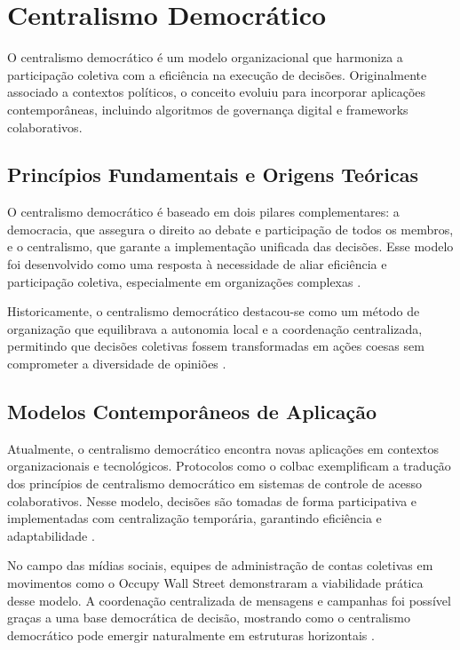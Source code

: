 \section{Centralismo Democrático}
\label{sec:centralismo_democratico}

O centralismo democrático é um modelo organizacional que harmoniza a
participação coletiva com a eficiência na execução de decisões.
Originalmente associado a contextos políticos, o conceito evoluiu para
incorporar aplicações contemporâneas, incluindo algoritmos de governança
digital e frameworks colaborativos.

\subsection{Princípios Fundamentais e Origens Teóricas}
\label{sec:principios_origens_teoricas}

O centralismo democrático é baseado em dois pilares complementares: a
democracia, que assegura o direito ao debate e participação de todos os
membros, e o centralismo, que garante a implementação unificada das
decisões. Esse modelo foi desenvolvido como uma resposta à necessidade de
aliar eficiência e participação coletiva, especialmente em organizações
complexas \cite{EstatutosDoPCP}.

Historicamente, o centralismo democrático destacou-se como um método de
organização que equilibrava a autonomia local e a coordenação centralizada,
permitindo que decisões coletivas fossem transformadas em ações coesas sem
comprometer a diversidade de opiniões \cite{CGTPStatutes}.

\subsection{Modelos Contemporâneos de Aplicação}
\label{sec:modelos_contemporaneos}

Atualmente, o centralismo democrático encontra novas aplicações em
contextos organizacionais e tecnológicos. Protocolos como o \gls{colbac}
exemplificam a tradução dos princípios de centralismo democrático em
sistemas de controle de acesso colaborativos. Nesse modelo, decisões são
tomadas de forma participativa e implementadas com centralização
temporária, garantindo eficiência e adaptabilidade \cite{Colbac}.

No campo das mídias sociais, equipes de administração de contas coletivas
em movimentos como o Occupy Wall Street demonstraram a viabilidade prática
desse modelo. A coordenação centralizada de mensagens e campanhas foi
possível graças a uma base democrática de decisão, mostrando como o
centralismo democrático pode emergir naturalmente em estruturas horizontais
\cite{SocialMediaTeamsAsDigitalVanguards}.

